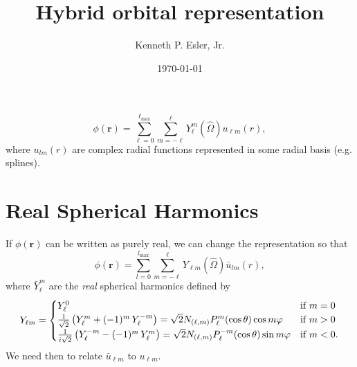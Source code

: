 \documentclass{article}
\author{Kenneth P. Esler, Jr.}
\title{Hybrid orbital representation}
\date{\today}
\begin{document}
\newcommand{\vr}{\mathbf{r}}
\maketitle
\begin{equation}
\phi(\vr) = \sum_{\ell=0}^{\ell_\text{max}} \sum_{m=-\ell}^\ell Y_\ell^m (\hat{\Omega})
u_{\ell m}(r),
\end{equation}
where $u_{lm}(r)$ are complex radial functions represented in some
radial basis (e.g. splines).

\section{Real Spherical Harmonics}
If $\phi(\vr)$ can be written as purely real, we can change the
representation so that
\begin{equation}
\phi(\vr) = \sum_{l=0}^{l_\text{max}} \sum_{m=-\ell}^\ell Y_{\ell m}(\hat{\Omega})
\bar{u}_{lm}(r),
\end{equation}
where $\bar{Y}_\ell^m$ are the {\em real} spherical harmonics defined by
\begin{equation}
Y_{\ell m} = \begin{cases}
Y_\ell^0 & \mbox{if } m=0\\
{1\over\sqrt2}\left(Y_\ell^m+(-1)^m \, Y_\ell^{-m}\right) = \sqrt{2} N_{(\ell,m)} P_\ell^m(\cos \theta) \cos m\varphi 
& \mbox{if } m>0 \\
{1\over i\sqrt2}\left(Y_\ell^{-m}-(-1)^{m}\, Y_\ell^{m}\right) = \sqrt{2} N_{(\ell,m)} P_\ell^{-m}(\cos \theta) \sin m\varphi 
&\mbox{if } m<0.
\end{cases}
\end{equation}
We need then to relate $\bar{u}_{\ell m}$ to $u_{\ell m}$.
\end{document}
